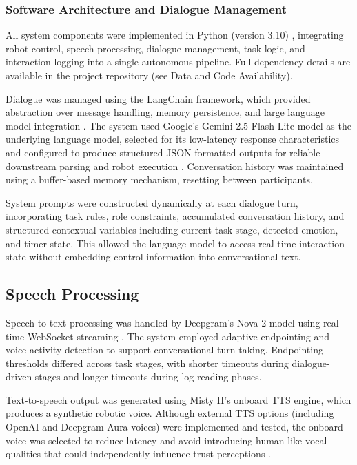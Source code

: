 \documentclass[
  authoryear,
  doubleblind,
  3p]{elsarticle}
\begin{document}
\subsubsection{Software Architecture and Dialogue
Management}\label{software-architecture-and-dialogue-management}

All system components were implemented in Python (version 3.10)
\citep{python}, integrating robot control, speech processing, dialogue
management, task logic, and interaction logging into a single autonomous
pipeline. Full dependency details are available in the project
repository (see Data and Code Availability).

Dialogue was managed using the LangChain framework, which provided
abstraction over message handling, memory persistence, and large
language model integration \citep{Chase_LangChain_2022}. The system used
Google's Gemini 2.5 Flash Lite model as the underlying language model,
selected for its low-latency response characteristics and configured to
produce structured JSON-formatted outputs for reliable downstream
parsing and robot execution \citep{gemini}. Conversation history was
maintained using a buffer-based memory mechanism, resetting between
participants.

System prompts were constructed dynamically at each dialogue turn,
incorporating task rules, role constraints, accumulated conversation
history, and structured contextual variables including current task
stage, detected emotion, and timer state. This allowed the language
model to access real-time interaction state without embedding control
information into conversational text.

\subsection{Speech Processing}\label{speech-processing}

Speech-to-text processing was handled by Deepgram's Nova-2 model using
real-time WebSocket streaming \citep{deepgram}. The system employed
adaptive endpointing and voice activity detection to support
conversational turn-taking. Endpointing thresholds differed across task
stages, with shorter timeouts during dialogue-driven stages and longer
timeouts during log-reading phases.

Text-to-speech output was generated using Misty II's onboard TTS engine,
which produces a synthetic robotic voice. Although external TTS options
(including OpenAI and Deepgram Aura voices) were implemented and tested,
the onboard voice was selected to reduce latency and avoid introducing
human-like vocal qualities that could independently influence trust
perceptions \citep{OpenAI2023ChatGPT}.
\end{document}
